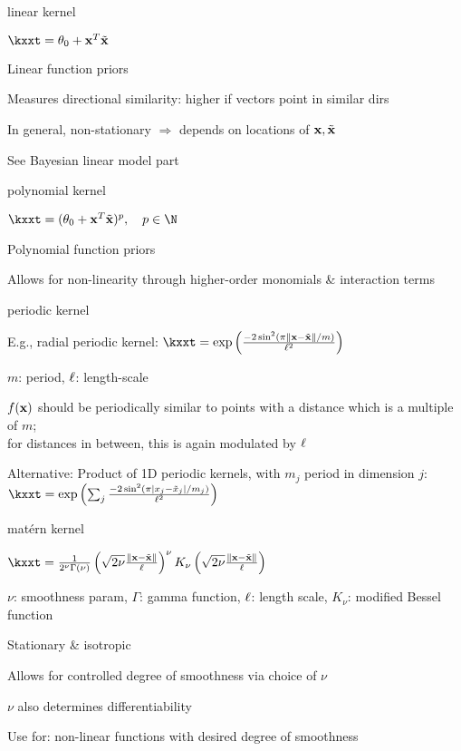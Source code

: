 \documentclass[11pt,compress,t,notes=noshow, xcolor=table]{beamer}
\begin{document}
\begin{framei}{linear kernel}
\item $\kxxt = \theta_0 + \xv^T \xtil$
\item Linear function priors
\item Measures directional similarity: higher if vectors point in similar dirs
\item In general, non-stationary $\Rightarrow$ depends on locations of $\mathbf{x}, \tilde{\mathbf{x}}$
\item See Bayesian linear model part
\vfill
{}
\end{framei}

\begin{framei}{polynomial kernel}
\item $\kxxt = (\theta_0 + \xv^T \xtil )^p, \quad p \in \N$
\item Polynomial function priors
\item Allows for non-linearity through higher-order monomials \& interaction terms
\vfill
{}
\end{framei}

\begin{framei}{periodic kernel}
\item E.g., radial periodic kernel: $\kxxt = \exp \left(\frac{-2\sin^2 (\pi \xxtnorm / m)}{\ls^2} \right)$
\item $m$: period, $\ell$: length-scale
\item $f(\mathbf{x})$ should be periodically similar to points with a distance which is a multiple of $m$;\\
for distances in between, this is again modulated by $\ell$
\item Alternative: Product of 1D periodic kernels, with $m_j$ period in dimension $j$: $\kxxt =  \exp \left(\sum_j\frac{-2\sin^2 (\pi |x_j - \tilde{x}_j| / m_j)}{\ls^2} \right)$
\vfill
{}
\end{framei}

\begin{framei}{matérn kernel}
\item $\kxxt = \frac{1}{2^\nu \Gamma(\nu)} \left( \sqrt{2 \nu} \frac{\xxtnorm}{\ls} \right)^\nu K_\nu \left( \sqrt{2 \nu} \frac{\xxtnorm}{\ls} \right)$
\item $\nu$: smoothness param, $\Gamma$: gamma function, $\ell$: length scale, $K_\nu$: modified Bessel function
\item Stationary \& isotropic
\item Allows for controlled degree of smoothness via choice of $\nu$
\item $\nu$ also determines differentiability
\item Use for: non-linear functions with desired degree of smoothness
\vfill
{}
\end{framei}
\end{document}
